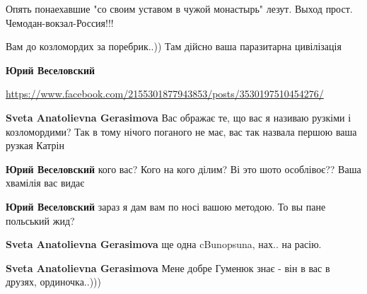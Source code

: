 Опять понаехавшие "со своим уставом в чужой монастырь" лезут. Выход прост. Чемодан-вокзал-Россия!!!


Вам до козломордих за поребрик..))
Там дійсно ваша паразитарна цивілізація

\begin{itemize}

\textbf{Юрий Веселовский} 

\url{https://www.facebook.com/2155301877943853/posts/3530197510454276/}


\textbf{Sveta Anatolievna Gerasimova} Вас ображає те, що вас я називаю рузкіми і козломордими?
Так в тому нічого поганого не має, вас так назвала першою ваша рузкая Катрін


\textbf{Юрий Веселовский} кого вас? Кого на кого ділим? Ві это шото особлівоє?? Ваша хвамілія вас видає🤣🤣


\textbf{Юрий Веселовский} зараз я дам вам по носі вашою методою. То вы пане польський жид?


\textbf{Sveta Anatolievna Gerasimova} ще одна cBunopsuna, нах.. на расію.


\textbf{Sveta Anatolievna Gerasimova} Мене добре Гуменюк знає - він в вас в друзях, ординочка..)))


\end{itemize}
